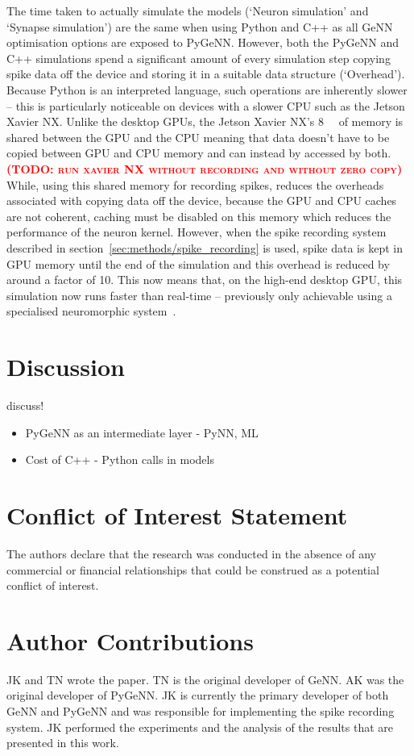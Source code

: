 \documentclass[utf8]{frontiersSCNS} %
\newcommand{\todo}[1]{\textbf{\textsc{\textcolor{red}{(TODO: #1)}}}}
\begin{document}
The time taken to actually simulate the models (`Neuron simulation' and `Synapse simulation') are the same when using Python and C++ as all GeNN optimisation options are exposed to PyGeNN.
However, both the PyGeNN and C++ simulations spend a significant amount of every simulation step copying spike data off the device and storing it in a suitable data structure (`Overhead').
Because Python is an interpreted language, such operations are inherently slower -- this is particularly noticeable on devices with a slower CPU such as the Jetson Xavier NX.
Unlike the desktop GPUs, the Jetson Xavier NX's \SI{8}{\giga\byte} of memory is shared between the GPU and the CPU meaning that data doesn't have to be copied between GPU and CPU memory and can instead by accessed by both.
\todo{run xavier NX without recording and without zero copy}
While, using this shared memory for recording spikes, reduces the overheads associated with copying data off the device, because the GPU and CPU caches are not coherent, caching must be disabled on this memory which reduces the performance of the neuron kernel.
However, when the spike recording system described in section~\ref{sec:methods/spike_recording} is used, spike data is kept in GPU memory until the end of the simulation and this overhead is reduced by around a factor of 10.
This now means that, on the high-end desktop GPU, this simulation now runs faster than real-time -- previously only achievable using a specialised neuromorphic system~\citep{Rhodes2019}.

\section{Discussion}
discuss!
\begin{itemize}
    \item PyGeNN as an intermediate layer - PyNN, ML
    \item Cost of C++ - Python calls in models
\end{itemize}

\section*{Conflict of Interest Statement}
The authors declare that the research was conducted in the absence of any commercial or financial relationships that could be construed as a potential conflict of interest.

\section*{Author Contributions}
JK and TN wrote the paper.
TN is the original developer of GeNN.
AK was the original developer of PyGeNN.
JK is currently the primary developer of both GeNN and PyGeNN and was responsible for implementing the spike recording system.
JK performed the experiments and the analysis of the results that are presented in this work.
\end{document}
